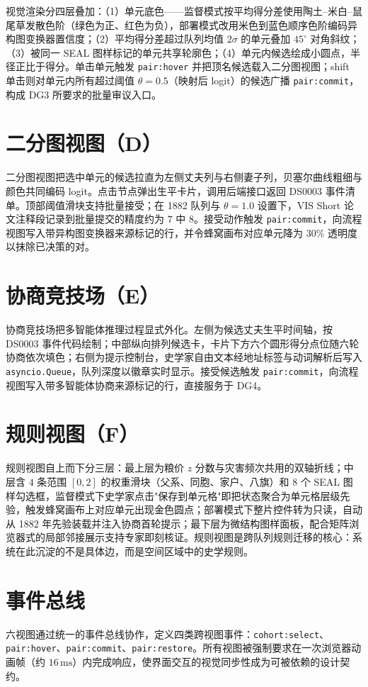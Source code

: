 视觉渲染分四层叠加：（1）单元底色——监督模式按平均得分差使用陶土--米白--鼠尾草发散色阶（绿色为正、红色为负），部署模式改用米色到蓝色顺序色阶编码异构图变换器置信度；（2）平均得分差超过队列均值 $2\sigma$ 的单元叠加 $45^{\circ}$ 对角斜纹；（3）被同一 SEAL 图样标记的单元共享轮廓色；（4）单元内候选绘成小圆点，半径正比于得分。单击单元触发 \texttt{pair:hover} 并把顶名候选载入二分图视图；shift 单击则对单元内所有超过阈值 $\theta=0.5$（映射后 logit）的候选广播 \texttt{pair:commit}，构成 DG3 所要求的批量审议入口。

\section{二分图视图（D）}\label{sec:vis-D}

二分图视图把选中单元的候选拉直为左侧丈夫列与右侧妻子列，贝塞尔曲线粗细与颜色共同编码 logit。点击节点弹出生平卡片，调用后端接口返回 DS0003 事件清单。顶部阈值滑块支持批量接受；在 1882 队列与 $\theta=1.0$ 设置下，VIS Short 论文注释段记录到批量提交的精度约为 $7$ 中 $8$。接受动作触发 \texttt{pair:commit}，向流程视图写入带异构图变换器来源标记的行，并令蜂窝画布对应单元降为 $30\%$ 透明度以抹除已决策的对。

\section{协商竞技场（E）}\label{sec:vis-E}

协商竞技场把多智能体推理过程显式外化\citep{amershi2014modeltracker,fails2003interactiveml}。左侧为候选丈夫生平时间轴，按 DS0003 事件代码绘制；中部纵向排列候选卡，卡片下方六个圆形得分点位随六轮协商依次填色；右侧为提示控制台，史学家自由文本经地址标签与动词解析后写入 \texttt{asyncio.Queue}，队列深度以徽章实时显示。接受候选触发 \texttt{pair:commit}，向流程视图写入带多智能体协商来源标记的行，直接服务于 DG4。

\section{规则视图（F）}\label{sec:vis-F}

规则视图自上而下分三层：最上层为粮价 $z$ 分数与灾害频次共用的双轴折线；中层含 $4$ 条范围 $[0,2]$ 的权重滑块（父系、同胞、家户、八旗）和 $8$ 个 SEAL 图样勾选框，监督模式下史学家点击"保存到单元格"即把状态聚合为单元格层级先验，触发蜂窝画布上对应单元出现金色圆点；部署模式下整片控件转为只读，自动从 1882 年先验装载并注入协商首轮提示；最下层为微结构图样面板，配合矩阵浏览器式的局部邻接展示\citep{henry2006matrixexplorer,mcguffin2005genealogy}支持专家即刻核证。规则视图是跨队列规则迁移的核心：系统在此沉淀的不是具体边，而是空间区域中的史学规则。

\section{事件总线}\label{sec:vis-bus}

六视图通过统一的事件总线协作，定义四类跨视图事件：\texttt{cohort:select}、\texttt{pair:hover}、\texttt{pair:commit}、\texttt{pair:restore}。所有视图被强制要求在一次浏览器动画帧（约 $16\,\mathrm{ms}$）内完成响应，使界面交互的视觉同步性成为可被依赖的设计契约\citep{endert2017state}。
